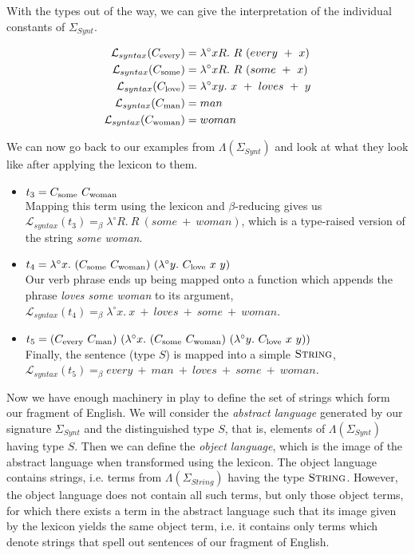 With the types out of the way, we can give the interpretation of the
individual constants of $\Sigma_{Synt}$.

\begin{align*}
\mathcal{L}_{syntax}(\synt{every}) &= \lambda^{\circ} x R.\ R\ (every\ +\ x) \\
\mathcal{L}_{syntax}(\synt{some}) &= \lambda^{\circ} x R.\ R\ (some\ +\ x) \\
\mathcal{L}_{syntax}(\synt{love}) &= \lambda^{\circ} x y.\ x\ +\ loves\ +\ y \\
\mathcal{L}_{syntax}(\synt{man}) &= man \\
\mathcal{L}_{syntax}(\synt{woman}) &= woman \\
\end{align*}

We can now go back to our examples from $\Lambda(\Sigma_{Synt})$ and
look at what they look like after applying the lexicon to them.

\begin{itemize}
\item $t_3 = \synt{some}\ \synt{woman}$ \\ Mapping this term using the
  lexicon and $\beta$-reducing gives us $\mathcal{L}_{syntax}(t_3)
  =_{\beta} \lambda^{\circ} R.\ R\ (some\ +\ woman)$, which is a
  type-raised version of the string \emph{some woman}.
\item $t_4 = \lambda^{\circ}
  x.\ (C_{\textrm{some}}\ C_{\textrm{woman}})\ (\lambda^{\circ}
  y.\ C_{\textrm{love}}\ x\ y)$ \\ Our verb phrase ends up being mapped onto
  a function which appends the phrase \emph{loves some woman} to its
  argument, $\mathcal{L}_{syntax}(t_4) =_{\beta} \lambda^{\circ}
  x.\ x\ +\ loves\ +\ some\ +\ woman$.
\item $t_5 = (\synt{every}\ \synt{man})\ (\lambda^{\circ}
  x.\ (\synt{some}\ \synt{woman})\ (\lambda^{\circ}
  y.\ \synt{love}\ x\ y))$ \\ Finally, the sentence (type $S$) is mapped
  into a simple $\textsc{String}$, $\mathcal{L}_{syntax}(t_5) =_{\beta}
  every\ +\ man\ +\ loves\ +\ some\ +\ woman$.
\end{itemize}

Now we have enough machinery in play to define the set of strings which
form our fragment of English. We will consider the \emph{abstract
  language} generated by our signature $\Sigma_{Synt}$ and the
distinguished type $S$, that is, elements of $\Lambda(\Sigma_{Synt})$
having type $S$. Then we can define the \emph{object language}, which is
the image of the abstract language when transformed using the
lexicon. The object language contains strings, i.e. terms from
$\Lambda(\Sigma_{String})$ having the type $\textsc{String}$. However,
the object language does not contain all such terms, but only those
object terms, for which there exists a term in the abstract language
such that its image given by the lexicon yields the same object term,
i.e. it contains only terms which denote strings that spell out
sentences of our fragment of English.

